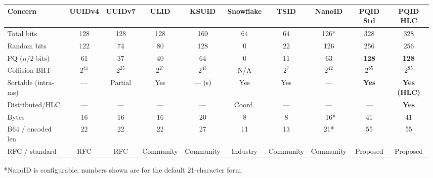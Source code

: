 \begin{center}
\renewcommand{\arraystretch}{1.15}
\footnotesize
\begin{tabular}{lccccccccc}
\toprule
\textbf{Concern} & \textbf{UUIDv4} & \textbf{UUIDv7} & \textbf{ULID} & \textbf{KSUID} & \textbf{Snowflake} & \textbf{TSID} & \textbf{NanoID} & \textbf{PQID Std} & \textbf{PQID HLC} \\
\midrule
Total bits         & 128       & 128        & 128        & 160        & 64         & 64         & 126*       & 328                 & 328 \\
Random bits        & 122       & 74         & 80         & 128        & 0          & 22         & 126        & 256                 & 256 \\
PQ ($n/2$ bits)    & 61        & 37         & 40         & 64         & 0          & 11         & 63         & \textbf{128}        & \textbf{128} \\
Collision BHT      & $2^{41}$  & $2^{25}$   & $2^{27}$   & $2^{43}$   & N/A        & $2^{7}$    & $2^{42}$   & \textbf{$2^{85}$}   & \textbf{$2^{85}$} \\
Sortable (intra-ms)& ---       & Partial    & Yes        & --- (s)    & Yes        & Yes        & ---        & \textbf{Yes}        & \textbf{Yes (HLC)} \\
Distributed/HLC    & ---       & ---        & ---        & ---        & Coord.     & ---        & ---        & ---                 & \textbf{Yes} \\
Bytes              & 16        & 16         & 16         & 20         & 8          & 8          & ~16*       & 41                  & 41 \\
B64 / encoded len  & 22        & 22         & 22         & 27         & 11         & 13         & 21*        & 55                  & 55 \\
RFC / standard     & RFC       & RFC        & Community  & Community  & Industry   & Community  & Community  & Proposed            & Proposed \\
\bottomrule
\end{tabular}

\smallskip
\noindent\footnotesize{*NanoID is configurable; numbers shown are for the default 21-character form.}\normalsize
\end{center}

